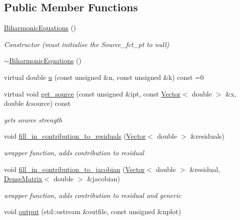 \subsection*{Public Member Functions}
\begin{DoxyCompactItemize}
\item 
\hyperlink{classoomph_1_1BiharmonicEquations_a3b1e64c3b1834613c3ce2ba16191292d}{Biharmonic\+Equations} ()
\begin{DoxyCompactList}\small\item\em Constructor (must initialise the Source\+\_\+fct\+\_\+pt to null) \end{DoxyCompactList}\item 
\hyperlink{classoomph_1_1BiharmonicEquations_a8e0024f4f9cd62f63515cd24f3c6af1e}{$\sim$\+Biharmonic\+Equations} ()
\item 
virtual double \hyperlink{classoomph_1_1BiharmonicEquations_aebe4e72a90f24cde0f34cf14287e3721}{u} (const unsigned \&n, const unsigned \&k) const =0
\item 
virtual void \hyperlink{classoomph_1_1BiharmonicEquations_a38a2cd656bff448e982512af9b85276f}{get\+\_\+source} (const unsigned \&ipt, const \hyperlink{classoomph_1_1Vector}{Vector}$<$ double $>$ \&x, double \&source) const
\begin{DoxyCompactList}\small\item\em gets source strength \end{DoxyCompactList}\item 
void \hyperlink{classoomph_1_1BiharmonicEquations_a04d86cdba2132d715ecc6d1a95e7afa6}{fill\+\_\+in\+\_\+contribution\+\_\+to\+\_\+residuals} (\hyperlink{classoomph_1_1Vector}{Vector}$<$ double $>$ \&residuals)
\begin{DoxyCompactList}\small\item\em wrapper function, adds contribution to residual \end{DoxyCompactList}\item 
void \hyperlink{classoomph_1_1BiharmonicEquations_ab96faece91161d22770aba9c3e6747f1}{fill\+\_\+in\+\_\+contribution\+\_\+to\+\_\+jacobian} (\hyperlink{classoomph_1_1Vector}{Vector}$<$ double $>$ \&residual, \hyperlink{classoomph_1_1DenseMatrix}{Dense\+Matrix}$<$ double $>$ \&jacobian)
\begin{DoxyCompactList}\small\item\em wrapper function, adds contribution to residual and generic \end{DoxyCompactList}\item 
void \hyperlink{classoomph_1_1BiharmonicEquations_a65124187a9935b51b6c635f457d0fa2c}{output} (std\+::ostream \&outfile, const unsigned \&nplot)

\end{DoxyCompactItemize}
